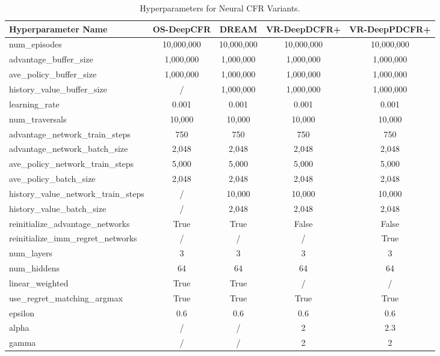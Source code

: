 \documentclass[letterpaper]{article} %
\begin{document}
\begin{table}[h]
	\centering
    \begin{tabular}{lcccc}
        \toprule
        \textbf{Hyperparameter Name}     & \textbf{OS-DeepCFR} & \textbf{DREAM} & \textbf{VR-DeepDCFR+} & \textbf{VR-DeepPDCFR+} \\ \midrule
        
        num\_episodes&  10,000,000& 10,000,000& 10,000,000& 10,000,000\\
        advantage\_buffer\_size&  1,000,000&  1,000,000&  1,000,000&  1,000,000\\
        ave\_policy\_buffer\_size&  1,000,000&  1,000,000&  1,000,000&  1,000,000\\
        history\_value\_buffer\_size&  / &  1,000,000&  1,000,000&  1,000,000\\
        learning\_rate&  0.001&  0.001&  0.001&  0.001\\
        num\_traversals&  10,000&  10,000&  10,000&  10,000\\
        advantage\_network\_train\_steps&  750&  750&  750&  750\\
        advantage\_network\_batch\_size&  2,048&  2,048&  2,048&  2,048\\
        ave\_policy\_network\_train\_steps&  5,000&  5,000&  5,000&  5,000\\
        ave\_policy\_batch\_size&  2,048&  2,048&  2,048&  2,048\\
        history\_value\_network\_train\_steps&  /&  10,000&  10,000&  10,000\\
        history\_value\_batch\_size&  /&  2,048&  2,048&  2,048\\
        reinitialize\_advantage\_networks&  True&  True&  False&  False\\
        reinitialize\_imm\_regret\_networks& / &/ &/ &True\\
        num\_layers&  3&  3&  3&  3\\
        num\_hiddens&  64&  64&  64&  64\\
        linear\_weighted&  True & True& /& /\\
        use\_regret\_matching\_argmax&  True&  True&  True&  True\\
        epsilon&  0.6&  0.6&  0.6&  0.6\\
        alpha & / & / & 2 & 2.3\\
        gamma & / & / & 2 & 2 \\
        \bottomrule

	\end{tabular}
    \caption{Hyperparameters for Neural CFR Variants.}
    \label{tab:neural_cfr}
\end{table}
\end{document}
